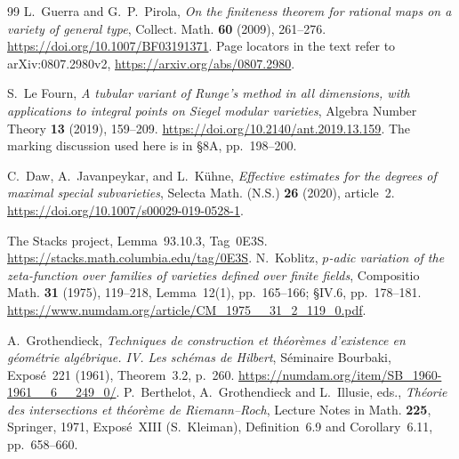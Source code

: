 \documentclass[11pt]{article}
\theoremstyle{definition}
\theoremstyle{remark}
\begin{document}
\begin{thebibliography}{99}
L.~Guerra and G.~P.~Pirola,
\emph{On the finiteness theorem for rational maps on a variety of general type},
Collect. Math. \textbf{60} (2009), 261--276.
\url{https://doi.org/10.1007/BF03191371}.
Page locators in the text refer to arXiv:0807.2980v2,
\url{https://arxiv.org/abs/0807.2980}.

S.~Le Fourn,
\emph{A tubular variant of Runge's method in all dimensions,
with applications to integral points on Siegel modular varieties},
Algebra Number Theory \textbf{13} (2019), 159--209.
\url{https://doi.org/10.2140/ant.2019.13.159}.
The marking discussion used here is in \S8A, pp.~198--200.

C.~Daw, A.~Javanpeykar, and L.~K\"uhne,
\emph{Effective estimates for the degrees of maximal special subvarieties},
Selecta Math. (N.S.) \textbf{26} (2020), article~2.
\url{https://doi.org/10.1007/s00029-019-0528-1}.

 The Stacks project,
Lemma~93.10.3, Tag~0E3S.
\url{https://stacks.math.columbia.edu/tag/0E3S}.
 N.~Koblitz,
\emph{$p$-adic variation of the zeta-function over families of
varieties defined over finite fields}, Compositio Math.
\textbf{31} (1975), 119--218, Lemma~12(1), pp.~165--166;
\S IV.6, pp.~178--181.
\url{https://www.numdam.org/article/CM_1975__31_2_119_0.pdf}.


 A.~Grothendieck,
\emph{Techniques de construction et th\'eor\`emes d'existence
en g\'eom\'etrie alg\'ebrique. IV. Les sch\'emas de Hilbert},
S\'eminaire Bourbaki, Expos\'e~221 (1961),
Theorem~3.2, p.~260.
\url{https://numdam.org/item/SB_1960-1961__6__249_0/}.
 P.~Berthelot, A.~Grothendieck and L.~Illusie, eds.,
\emph{Th\'eorie des intersections et th\'eor\`eme de Riemann--Roch},
Lecture Notes in Math. \textbf{225}, Springer, 1971,
Expos\'e~XIII (S.~Kleiman), Definition~6.9 and Corollary~6.11,
pp.~658--660.

\end{thebibliography}
\end{document}
